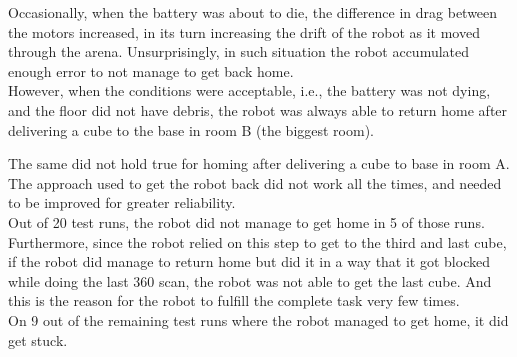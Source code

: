 Occasionally, when the battery was about to die, the difference in drag between the motors increased, in its turn increasing the drift of the robot as it moved through the arena. Unsurprisingly, in such situation the robot accumulated enough error to not manage to get back home.\\
However, when the conditions were acceptable, i.e., the battery was not dying, and the floor did not have debris, the robot was always able to return home after delivering a cube to the base in room B (the biggest room).

The same did not hold true for homing after delivering a cube to base in room A. The approach used to get the robot back did not work all the times, and needed to be improved for greater reliability.\\
Out of 20 test runs, the robot did not manage to get home in 5 of those runs.\\
Furthermore, since the robot relied on this step to get to the third and last cube, if the robot did manage to return home but did it in a way that it got blocked while doing the last 360 scan, the robot was not able to get the last cube. And this is the reason for the robot to fulfill the complete task very few times.\\
On 9 out of the remaining test runs where the robot managed to get home, it did get stuck.

\newpage
